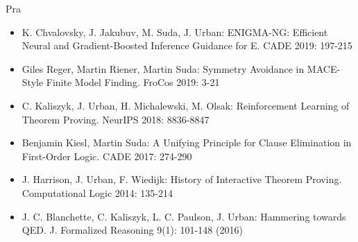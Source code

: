 \begin{sitedescription}{Pra}
\begin{itemize}
\item K. Chvalovsky, J. Jakubuv, M. Suda, J. Urban: ENIGMA-NG: Efficient Neural and Gradient-Boosted Inference Guidance for E. CADE 2019: 197-215
  \item Giles Reger, Martin Riener, Martin Suda:
    Symmetry Avoidance in MACE-Style Finite Model Finding. FroCos 2019: 3-21
\item C. Kaliszyk, J. Urban, H. Michalewski, M. Olsak: Reinforcement Learning of Theorem Proving. NeurIPS 2018: 8836-8847
   \item Benjamin Kiesl, Martin Suda:
A Unifying Principle for Clause Elimination in First-Order Logic. CADE 2017: 274-290
    \item J. Harrison, J. Urban, F. Wiedijk: History of Interactive Theorem Proving. Computational Logic 2014: 135-214
    \item J. C. Blanchette, C. Kaliszyk, L. C. Paulson, J. Urban:
      Hammering towards QED. J. Formalized Reasoning 9(1): 101-148 (2016)

\end{itemize}
\end{sitedescription}
